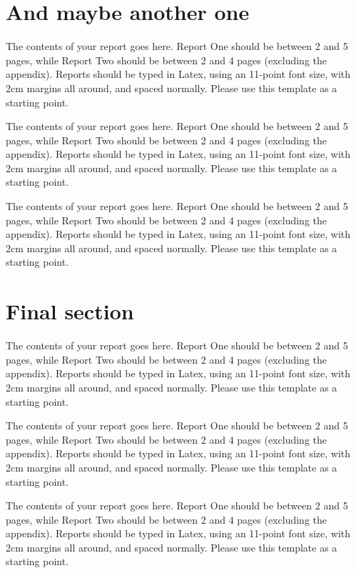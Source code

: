 \documentclass[a4paper,11pt]{article}
\begin{document}
\section{And maybe another one}

The contents of your report goes here.  Report One should be between 2
and 5 pages, while Report Two should be between 2 and 4 pages
(excluding the appendix).  Reports should be typed in Latex, using an
11-point font size, with 2cm margins all around, and spaced normally.
Please use this template as a starting point.

The contents of your report goes here.  Report One should be between 2
and 5 pages, while Report Two should be between 2 and 4 pages
(excluding the appendix).  Reports should be typed in Latex, using an
11-point font size, with 2cm margins all around, and spaced normally.
Please use this template as a starting point.

The contents of your report goes here.  Report One should be between 2
and 5 pages, while Report Two should be between 2 and 4 pages
(excluding the appendix).  Reports should be typed in Latex, using an
11-point font size, with 2cm margins all around, and spaced normally.
Please use this template as a starting point.


\section{Final section}

The contents of your report goes here.  Report One should be between 2
and 5 pages, while Report Two should be between 2 and 4 pages
(excluding the appendix).  Reports should be typed in Latex, using an
11-point font size, with 2cm margins all around, and spaced normally.
Please use this template as a starting point.

The contents of your report goes here.  Report One should be between 2
and 5 pages, while Report Two should be between 2 and 4 pages
(excluding the appendix).  Reports should be typed in Latex, using an
11-point font size, with 2cm margins all around, and spaced normally.
Please use this template as a starting point.

The contents of your report goes here.  Report One should be between 2
and 5 pages, while Report Two should be between 2 and 4 pages
(excluding the appendix).  Reports should be typed in Latex, using an
11-point font size, with 2cm margins all around, and spaced normally.
Please use this template as a starting point.
\end{document}
